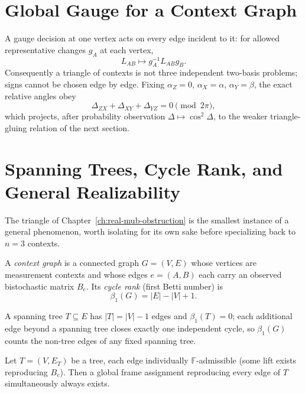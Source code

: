\section{Global Gauge for a Context Graph}

A gauge decision at one vertex acts on every edge incident to it: for allowed
representative changes $g_A$ at each vertex,
\begin{equation}
L_{AB} \mapsto g_A^{-1} L_{AB} g_B.
\end{equation}
Consequently a triangle of contexts is not three independent two-basis problems;
signs cannot be chosen edge by edge. Fixing $\alpha_Z = 0$, $\alpha_X = \alpha$,
$\alpha_Y = \beta$, the exact relative angles obey
\begin{equation}
\Delta_{ZX} + \Delta_{XY} + \Delta_{YZ} = 0 \pmod{2\pi},
\end{equation}
which projects, after probability observation $\Delta \mapsto \cos^2\Delta$, to
the weaker triangle-gluing relation of the next section.

\section{Spanning Trees, Cycle Rank, and General Realizability}
\label{sec:spanning-trees}

The triangle of Chapter~\ref{ch:real-mub-obstruction} is the smallest instance
of a general phenomenon, worth isolating for its own sake before specializing
back to $n=3$ contexts.

\begin{definition}
A \emph{context graph} is a connected graph $G=(V,E)$ whose vertices are
measurement contexts and whose edges $e=(A,B)$ each carry an observed
bistochastic matrix $B_e$. Its \emph{cycle rank} (first Betti number) is
\begin{equation}
\beta_1(G) = |E| - |V| + 1.
\end{equation}
\end{definition}

A spanning tree $T \subseteq E$ has $|T| = |V|-1$ edges and $\beta_1(T) = 0$;
each additional edge beyond a spanning tree closes exactly one independent
cycle, so $\beta_1(G)$ counts the non-tree edges of any fixed spanning tree.

\begin{proposition}
\label{prop:tree-no-constraint}
Let $T=(V,E_T)$ be a tree, each edge individually $\mathbb F$-admissible (some
lift exists reproducing $B_e$). Then a global frame assignment reproducing
every edge of $T$ simultaneously always exists.
\end{proposition}

